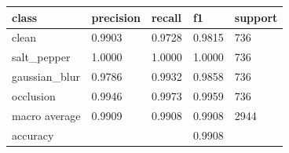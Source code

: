 \begin{tabular}{lllll}
\hline
class & precision & recall & f1 & support \\
\hline
clean & 0.9903 & 0.9728 & 0.9815 & 736 \\
salt\_pepper & 1.0000 & 1.0000 & 1.0000 & 736 \\
gaussian\_blur & 0.9786 & 0.9932 & 0.9858 & 736 \\
occlusion & 0.9946 & 0.9973 & 0.9959 & 736 \\
macro average & 0.9909 & 0.9908 & 0.9908 & 2944 \\
accuracy &  &  & 0.9908 &  \\
\hline
\end{tabular}
